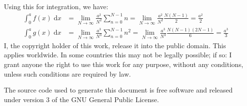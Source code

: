 \documentclass{article}
\theoremstyle{normal}
\theoremstyle{plain}
\begin{document}
    Using this for integration, we have:
    \begin{align}
        \int_{0}^{a}f(x)\;\textrm{d}x
            &=\lim_{N\rightarrow\infty}\frac{a^{2}}{N^{2}}\sum_{n=0}^{N-1}n
            =\lim_{N\rightarrow\infty}\frac{a^{2}}{N^{2}}\frac{N(N-1)}{2}
            =\frac{a^{2}}{2}\\
        \int_{0}^{a}g(x)\;\textrm{d}x
            &=\lim_{N\rightarrow\infty}
            \frac{a^{3}}{N^{3}}\sum_{n=0}^{N-1}n^{2}
            =\lim_{N\rightarrow\infty}\frac{a^{3}}{N^{3}}
                \frac{N(N-1)(2N-1)}{6}
            =\frac{a^{3}}{3}
    \end{align}
    \newpage
    I, the copyright holder of this work, release it into the public domain.
    This applies worldwide. In some countries this may not be legally possible;
    if so: I grant anyone the right to use this work for any purpose, without
    any conditions, unless such conditions are required by law.
    \par\hfill\par
    The source code used to generate this document is free software and released
    under version 3 of the GNU General Public License.
\end{document}
